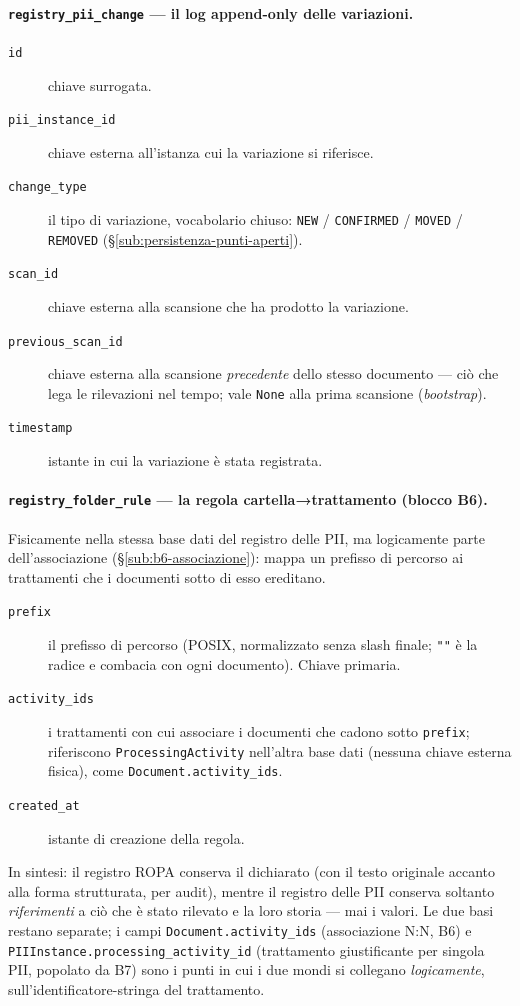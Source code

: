 \paragraph{\texttt{registry\_pii\_change} --- il log append-only delle variazioni.}
\begin{description}
	\item[\texttt{id}] chiave surrogata.
	\item[\texttt{pii\_instance\_id}] chiave esterna all'istanza cui la variazione si riferisce.
	\item[\texttt{change\_type}] il tipo di variazione, vocabolario chiuso: \texttt{NEW} / \texttt{CONFIRMED} / \texttt{MOVED} / \texttt{REMOVED} (§\ref{sub:persistenza-punti-aperti}).
	\item[\texttt{scan\_id}] chiave esterna alla scansione che ha prodotto la variazione.
	\item[\texttt{previous\_scan\_id}] chiave esterna alla scansione \emph{precedente} dello stesso documento --- ciò che lega le rilevazioni nel tempo; vale \texttt{None} alla prima scansione (\emph{bootstrap}).
	\item[\texttt{timestamp}] istante in cui la variazione è stata registrata.
\end{description}

\paragraph{\texttt{registry\_folder\_rule} --- la regola cartella→trattamento (blocco B6).}
Fisicamente nella stessa base dati del registro delle PII, ma logicamente parte dell'associazione (§\ref{sub:b6-associazione}): mappa un prefisso di percorso ai trattamenti che i documenti sotto di esso ereditano.
\begin{description}
	\item[\texttt{prefix}] il prefisso di percorso (POSIX, normalizzato senza slash finale; \texttt{""} è la radice e combacia con ogni documento). Chiave primaria.
	\item[\texttt{activity\_ids}] i trattamenti con cui associare i documenti che cadono sotto \texttt{prefix}; riferiscono \texttt{ProcessingActivity} nell'altra base dati (nessuna chiave esterna fisica), come \texttt{Document.activity\_ids}.
	\item[\texttt{created\_at}] istante di creazione della regola.
\end{description}

In sintesi: il registro ROPA conserva il dichiarato (con il testo originale accanto alla forma strutturata, per audit), mentre il registro delle PII conserva soltanto \emph{riferimenti} a ciò che è stato rilevato e la loro storia --- mai i valori. Le due basi restano separate; i campi \texttt{Document.activity\_ids} (associazione N:N, B6) e \texttt{PIIInstance.processing\_activity\_id} (trattamento giustificante per singola PII, popolato da B7) sono i punti in cui i due mondi si collegano \emph{logicamente}, sull'identificatore-stringa del trattamento.

